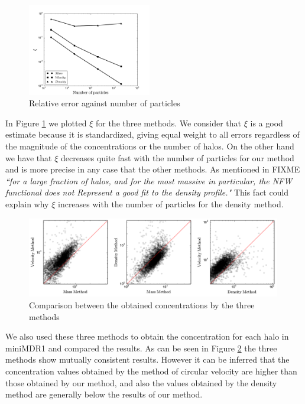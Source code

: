 \documentclass[useAMS,usenatbib]{mn2e}
\begin{document}
\begin{figure}
\begin{center}
  \includegraphics[width=0.48\textwidth]{error.pdf}
\end{center}
\caption{Relative error against number of particles
    \label{fig:error}}
\end{figure}

In Figure \ref{fig:error} we plotted $\xi$ for the three methods. We consider that $\xi$ is a good estimate because it is standardized, giving equal weight to all errors regardless of the magnitude of the concentrations or the number of halos. On the other hand we have that $\xi$ decreases quite fast with the number of particles for our method and is more precise in any case that the other methods. As mentioned in FIXME \textit{``for a large fraction of halos, and for the most massive in particular, the NFW functional does not Represent a good fit to the density profile."} This fact could explain why $\xi$ increases with the number of particles for the density method.

\begin{figure}
\begin{center}
  \includegraphics[width=0.99\textwidth]{mass-density-velocity.pdf}
\end{center}
\caption{Comparison between the obtained concentrations by the three methods
    \label{fig:mdv}}
\end{figure}

We also used these three methods to obtain the concentration for each halo in miniMDR1 and compared the results. As can be seen in Figure \ref{fig:mdv} the three methods show mutually consistent results. However it can be inferred that the concentration values ​​obtained by the method of circular velocity are higher than those obtained by our method, and also the values ​​obtained by the density method are generally below the results of our method.
\end{document}
